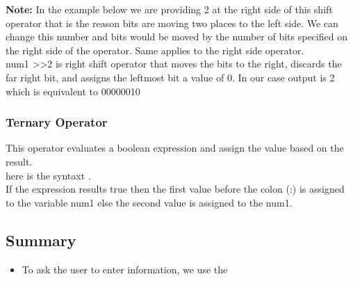 \documentclass[11pt, a4paper]{article}
\begin{document}
\textbf{Note:} In the example below we are providing 2 at the right side of this shift operator
that is the reason bits are moving two places to the left side. We can change this
number and bits would be moved by the number of bits specified on the right side
of the operator. Same applies to the right side operator.\\
num1 \textgreater\textgreater 2 is right shift operator that moves the bits to the right, discards
the far right bit, and assigns the leftmost bit a value of 0. In our case
output is 2 which is equivalent to 00000010


\subsubsection{Ternary Operator}
This operator evaluates a boolean expression and assign the value based on the result.\\
here is the syntaxt
.\\
If the expression results true then the first value before the colon (:)
is assigned to the variable num1 else the second value is assigned to the num1.


\subsection{Summary}
\begin{itemize}
    \item To ask the user to enter information, we use the 
\end{itemize}
\end{document}
